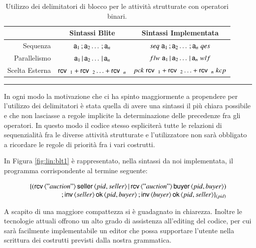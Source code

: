 \begin{table}
\begin{center}
\begin{tabular}{|r|c|c|}
\hline
 & Sintassi Blite & Sintassi Implementata \\
\hline
Sequenza & ${\sf a}_1 \, ; {\sf a}_2 \ldots \, ; {\sf a}_n $ & $seq \; {\sf a}_1 \, ;
{\sf a}_2 \ldots \, ; {\sf a}_n \; qes$ \\
\hline
Parallelismo & ${\sf a}_1 \,|\, {\sf a}_2 \ldots \,|\, {\sf a}_n $ & $flw \; {\sf a}_1 \,|\,
{\sf a}_2 \ldots \,|\, {\sf a}_n \; wlf$ \\
\hline
Scelta Esterna & ${\sf rcv}\,\, \,_1 + {\sf rcv}\,\, \,_2
\ldots + {\sf rcv}\,\, \,_n $ & $pck \; {\sf rcv}\,\, \,_1 + 
{\sf rcv}\,\, \,_2 \ldots + {\sf rcv}\,\, \,_n \; kcp$ \\
\hline
\end{tabular}
\caption[Delimitatori di blocco per le attività strutturate]{Utilizzo dei
delimitatori di blocco per le attività strutturate con operatori binari.}
\rule{7cm}{0.01cm}
\label{tab:blokmarks}
\end{center}
\end{table}

In ogni modo la motivazione che ci ha spinto maggiormente a propendere per
l'utilizzo dei delimitatori è stata quella di avere una sintassi il più chiara
possibile e che non lasciasse a regole implicite la determinazione delle
precedenze fra gli operatori. In questo modo il codice stesso espliciterà tutte le
relazioni di sequenzialità fra le diverse attività strutturate e l'utilizzatore non sarà
obbligato a ricordare le regole di priorità fra i vari costrutti.

In Figura \ref{fig:lin:blt1} è rappresentato, nella sintassi
da noi implementata, il programma corrispondente al termine seguente:

$$
\begin{array}{rl}
\{ 
(
	{\sf rcv}\,\langle "auction" \rangle \, {\sf seller}\, \langle pid, seller \rangle
	\,|\,
	{\sf rcv}\,\langle "auction" \rangle \, {\sf buyer}\, \langle pid, buyer \rangle 
)
\\
\, ; 
{\sf inv}\,\langle seller \rangle \,{\sf ok}\,\langle pid, buyer \rangle
\, ;
{\sf inv}\,\langle buyer \rangle \,{\sf ok}\,\langle pid, seller \rangle
 \}_{(pid)}
\end{array}
$$

A scapito di una maggiore compattezza si è guadagnato in chiarezza. Inoltre
le tecnologie attuali offrono un alto grado di assistenza all'editing del
codice, per cui sarà facilmente implementabile un editor che possa supportare
l'utente nella scrittura dei costrutti previsti dalla nostra grammatica.
\\

